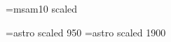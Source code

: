 
\font\tenmsa=msam10 scaled \scl	%

\ifnum{}
  \font\znameni=\fontdir astro scaled 950
  \font\znamenibig=\fontdir astro scaled 1900
\else
  \let\znameni=\relax
  \let\znamenibig=\relax
\fi



\def\levezahlavi{}

\def\pagenumbers{%
  \global\headline{%
    \ifodd\pageno%
      \setbox2=\hbox to\hsize{\tensf\firstmark}%
    \else%
      \setbox2=\hbox to\hsize{\tensf\levezahlavi}%
    \fi%
    \dp2=0pt%
    \ht2=10pt%
    \vbox{%
    \box2%
    \medskip
    \hrule
    }%
  }%
  \global\footline{%
    \ifodd\pageno%
      {\hfil{\tenrm\folio}}%
    \else%
      {{\tenrm\folio}\hfil}%
    \fi%
  }%
}

\def\nopageheader{%
  \headline{\hfil\pagenumbers}%
  \footline{%
    \ifodd\pageno%
      {\hfil{\tenrm\folio}}%
    \else%
      {{\tenrm\folio}\hfil}%
    \fi%
  }%
}

\def\nopagenumbers{%
  \headline{\hfil}%
  \footline{\hfil}%
}




\newcount\wasparagraph
{}

